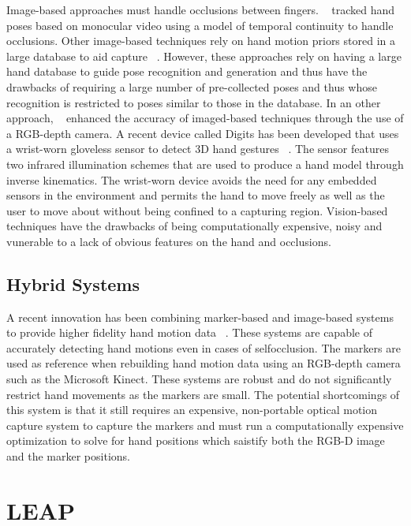 \documentclass[review]{acmsiggraph}
\begin{document}
Image-based approaches must handle occlusions between fingers. 
~\cite{LaGorce11ModelBased} tracked hand poses based on 
monocular video using a model of temporal continuity to handle occlusions. 
Other image-based techniques rely on hand motion priors stored in a large 
database to aid capture ~\cite{Wu01CapturingHand,Zhou03TrackingHand,Wang09ColorGlove,Romero10Hands}. 
However, these approaches rely on having a large hand database to guide pose 
recognition and generation and thus have the drawbacks of requiring 
a large number of pre-collected poses and thus whose recognition is 
restricted to poses similar to those in the database. 
In an other approach, ~\cite{Oikonomidis11EfficientModel} enhanced 
the accuracy of imaged-based techniques through the use of a RGB-depth camera. 
A recent device called Digits has been developed that
uses a wrist-worn gloveless sensor to detect 3D hand gestures
~\cite{KHI12}. The sensor features two infrared illumination
schemes that are used to produce a hand model
through inverse kinematics. The wrist-worn device avoids
the need for any embedded sensors in the environment and
permits the hand to move freely as well as the user to move
about without being confined to a capturing region.
Vision-based techniques have the drawbacks of being computationally expensive, 
noisy and vunerable to a lack of obvious features on the hand and occlusions.

\subsection{Hybrid Systems}

A recent innovation has been combining marker-based
and image-based systems to provide higher fidelity hand
motion data ~\cite{ZCX12}. These systems are capable of accurately
detecting hand motions even in cases of selfocclusion.
The markers are used as reference when rebuilding
hand motion data using an RGB-depth camera such as
the Microsoft Kinect. These systems are robust and do not
significantly restrict hand movements as the markers are
small. The potential shortcomings of this system is that it still requires 
an expensive, non-portable optical motion capture system to 
capture the markers and must run a computationally 
expensive optimization to solve for hand positions which 
saistify both the RGB-D image and the marker positions. 

\section{LEAP}
\end{document}
